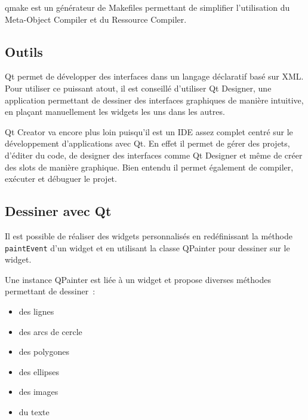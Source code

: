qmake est un générateur de Makefiles permettant de simplifier l'utilisation du Meta-Object Compiler et du Ressource Compiler.

\subsection{Outils}

Qt permet de développer des interfaces dans un langage déclaratif basé sur XML. Pour utiliser ce puissant atout, il est conseillé d'utiliser Qt Designer, une application permettant de dessiner des interfaces graphiques de manière intuitive, en plaçant manuellement les widgets les uns dans les autres.

Qt Creator va encore plus loin puisqu'il est un IDE assez complet centré sur le développement d'applications avec Qt. En effet il permet de gérer des projets, d'éditer du code, de designer des interfaces comme Qt Designer et même de créer des slots de manière graphique. Bien entendu il permet également de compiler, exécuter et débuguer le projet.

\subsection{Dessiner avec Qt}

Il est possible de réaliser des widgets personnalisés en redéfinissant la méthode \verb|paintEvent| d'un widget et en utilisant la classe QPainter pour dessiner sur le widget.

Une instance QPainter est liée à un widget et propose diverses méthodes permettant de dessiner~:
\begin{itemize}
	\item des lignes
	\item des arcs de cercle
	\item des polygones
	\item des ellipses
	\item des images
	\item du texte
\end{itemize}

